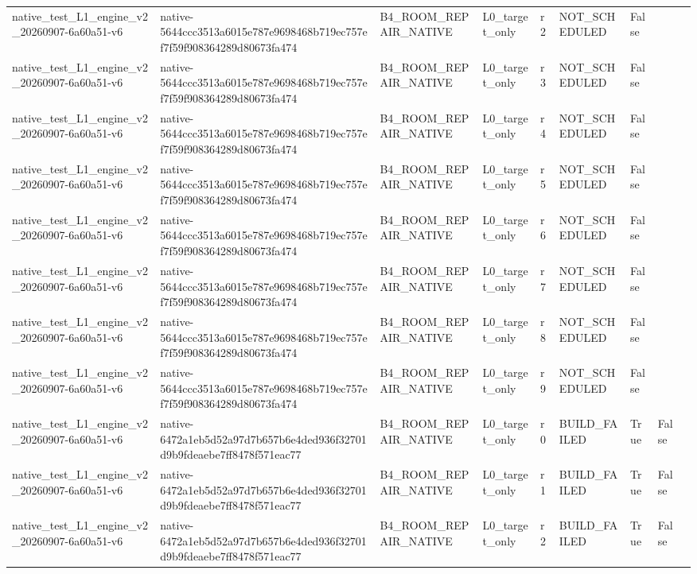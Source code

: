 \begin{tabular}{lllllllll}
native\_test\_L1\_engine\_v2\_20260907-6a60a51-v6 & native-5644ccc3513a6015e787e9698468b719ec757ef7f59f908364289d80673fa474 & B4\_ROOM\_REPAIR\_NATIVE & L0\_target\_only & r2 & NOT\_SCHEDULED & False &  &  \\
native\_test\_L1\_engine\_v2\_20260907-6a60a51-v6 & native-5644ccc3513a6015e787e9698468b719ec757ef7f59f908364289d80673fa474 & B4\_ROOM\_REPAIR\_NATIVE & L0\_target\_only & r3 & NOT\_SCHEDULED & False &  &  \\
native\_test\_L1\_engine\_v2\_20260907-6a60a51-v6 & native-5644ccc3513a6015e787e9698468b719ec757ef7f59f908364289d80673fa474 & B4\_ROOM\_REPAIR\_NATIVE & L0\_target\_only & r4 & NOT\_SCHEDULED & False &  &  \\
native\_test\_L1\_engine\_v2\_20260907-6a60a51-v6 & native-5644ccc3513a6015e787e9698468b719ec757ef7f59f908364289d80673fa474 & B4\_ROOM\_REPAIR\_NATIVE & L0\_target\_only & r5 & NOT\_SCHEDULED & False &  &  \\
native\_test\_L1\_engine\_v2\_20260907-6a60a51-v6 & native-5644ccc3513a6015e787e9698468b719ec757ef7f59f908364289d80673fa474 & B4\_ROOM\_REPAIR\_NATIVE & L0\_target\_only & r6 & NOT\_SCHEDULED & False &  &  \\
native\_test\_L1\_engine\_v2\_20260907-6a60a51-v6 & native-5644ccc3513a6015e787e9698468b719ec757ef7f59f908364289d80673fa474 & B4\_ROOM\_REPAIR\_NATIVE & L0\_target\_only & r7 & NOT\_SCHEDULED & False &  &  \\
native\_test\_L1\_engine\_v2\_20260907-6a60a51-v6 & native-5644ccc3513a6015e787e9698468b719ec757ef7f59f908364289d80673fa474 & B4\_ROOM\_REPAIR\_NATIVE & L0\_target\_only & r8 & NOT\_SCHEDULED & False &  &  \\
native\_test\_L1\_engine\_v2\_20260907-6a60a51-v6 & native-5644ccc3513a6015e787e9698468b719ec757ef7f59f908364289d80673fa474 & B4\_ROOM\_REPAIR\_NATIVE & L0\_target\_only & r9 & NOT\_SCHEDULED & False &  &  \\
native\_test\_L1\_engine\_v2\_20260907-6a60a51-v6 & native-6472a1eb5d52a97d7b657b6e4ded936f32701d9b9fdeaebe7ff8478f571eac77 & B4\_ROOM\_REPAIR\_NATIVE & L0\_target\_only & r0 & BUILD\_FAILED & True & False &  \\
native\_test\_L1\_engine\_v2\_20260907-6a60a51-v6 & native-6472a1eb5d52a97d7b657b6e4ded936f32701d9b9fdeaebe7ff8478f571eac77 & B4\_ROOM\_REPAIR\_NATIVE & L0\_target\_only & r1 & BUILD\_FAILED & True & False &  \\
native\_test\_L1\_engine\_v2\_20260907-6a60a51-v6 & native-6472a1eb5d52a97d7b657b6e4ded936f32701d9b9fdeaebe7ff8478f571eac77 & B4\_ROOM\_REPAIR\_NATIVE & L0\_target\_only & r2 & BUILD\_FAILED & True & False &  \\

\end{tabular}
